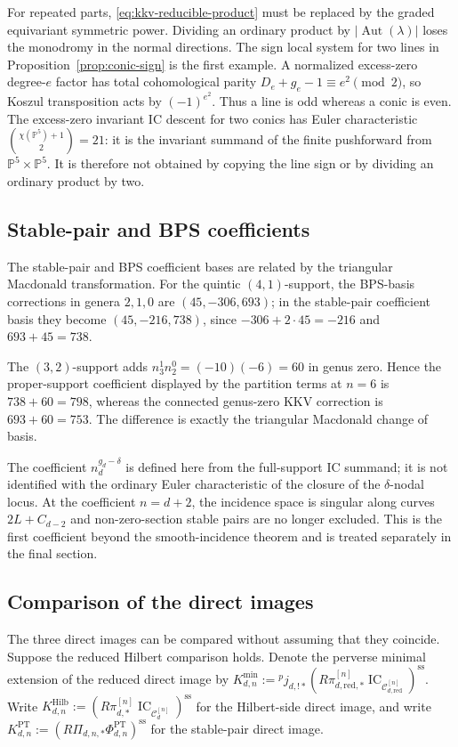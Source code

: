 \documentclass[11pt,reqno]{amsart}
\theoremstyle{definition}
\newcommand{\Pp}{\mathbb P}
\newcommand{\IC}{\operatorname{IC}}
\newcommand{\Hilb}{\operatorname{Hilb}}
\newcommand{\PT}{\operatorname{PT}}
\newcommand{\red}{\mathrm{red}}
\begin{document}
For repeated parts, \eqref{eq:kkv-reducible-product} must be replaced by the
graded equivariant symmetric power.  Dividing an ordinary product by
$|\operatorname{Aut}(\lambda)|$ loses the monodromy in the normal directions.
The sign local system for two lines in
Proposition~\ref{prop:conic-sign} is the first example.  A normalized
excess-zero degree-$e$ factor has total cohomological parity
$D_e+g_e-1\equiv e^2\pmod2$, so Koszul transposition acts by
$(-1)^{e^2}$.  Thus a line is odd whereas a conic is even.
The excess-zero invariant IC descent for two conics has Euler
characteristic $\binom{\chi(\Pp^5)+1}{2}=21$: it is the invariant summand of
the finite pushforward from $\Pp^5\times\Pp^5$.  It is therefore not obtained
by copying the line sign or by dividing an ordinary product by two.

\subsection{Stable-pair and BPS coefficients}

The stable-pair and BPS coefficient bases are related by the triangular
Macdonald transformation.  For the quintic
$(4,1)$-support, the BPS-basis corrections in genera $2,1,0$ are
$(45,-306,693)$; in the stable-pair coefficient basis they become
$(45,-216,738)$, since $-306+2\cdot45=-216$ and $693+45=738$.

The $(3,2)$-support adds
$n_3^1n_2^0=(-10)(-6)=60$ in genus zero.  Hence the proper-support
coefficient displayed by the partition terms at $n=6$ is
$738+60=798$, whereas the connected genus-zero KKV
correction is $693+60=753$.  The difference is exactly the triangular
Macdonald change of basis.

The coefficient $n_d^{g_d-\delta}$ is defined here from the full-support IC
summand; it is not identified with the ordinary Euler characteristic of the
closure of the $\delta$-nodal locus.  At the coefficient $n=d+2$, the
incidence space is singular along curves $2L+C_{d-2}$ and non-zero-section
stable pairs are no longer excluded.  This is the first coefficient beyond
the smooth-incidence theorem and is treated separately in the final
section.

\subsection{Comparison of the direct images}

The three direct images can be compared without assuming that they coincide.
Suppose the reduced Hilbert comparison holds.  Denote the perverse minimal
extension of the reduced direct image by
$K_{d,n}^{\min}:={}^pj_{d,!*}(R\pi_{d,\red,*}^{[n]}
\IC_{\mathcal C_{d,\red}^{[n]}})^{\mathrm{ss}}$.
Write $K_{d,n}^{\Hilb}:=(R\pi_{d,*}^{[n]}
\IC_{\mathcal C_d^{[n]}})^{\mathrm{ss}}$ for the Hilbert-side direct image,
and write $K_{d,n}^{\PT}:=(R\Pi_{d,n,*}
\Phi_{d,n}^{\PT})^{\mathrm{ss}}$ for the stable-pair direct image.
\end{document}
